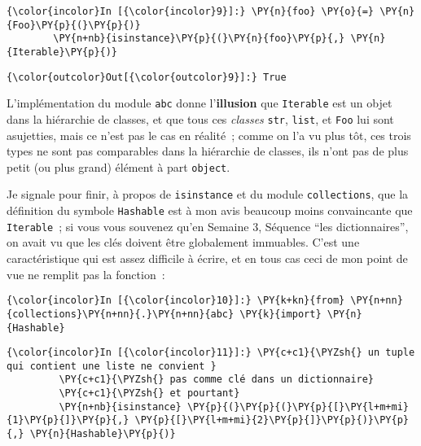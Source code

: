     \begin{Verbatim}[commandchars=\\\{\}]
{\color{incolor}In [{\color{incolor}9}]:} \PY{n}{foo} \PY{o}{=} \PY{n}{Foo}\PY{p}{(}\PY{p}{)}
        \PY{n+nb}{isinstance}\PY{p}{(}\PY{n}{foo}\PY{p}{,} \PY{n}{Iterable}\PY{p}{)}
\end{Verbatim}


\begin{Verbatim}[commandchars=\\\{\}]
{\color{outcolor}Out[{\color{outcolor}9}]:} True
\end{Verbatim}
            
    L'implémentation du module \texttt{abc} donne l'\textbf{illusion} que
\texttt{Iterable} est un objet dans la hiérarchie de classes, et que
tous ces \emph{classes} \texttt{str}, \texttt{list}, et \texttt{Foo} lui
sont asujetties, mais ce n'est pas le cas en réalité~; comme on l'a vu
plus tôt, ces trois types ne sont pas comparables dans la hiérarchie de
classes, ils n'ont pas de plus petit (ou plus grand) élément à part
\texttt{object}.

    Je signale pour finir, à propos de \texttt{isinstance} et du module
\texttt{collections}, que la définition du symbole \texttt{Hashable} est
à mon avis beaucoup moins convaincante que \texttt{Iterable}~; si vous
vous souvenez qu'en Semaine 3, Séquence ``les dictionnaires'', on avait
vu que les clés doivent être globalement immuables. C'est une
caractéristique qui est assez difficile à écrire, et en tous cas ceci de
mon point de vue ne remplit pas la fonction~:

    \begin{Verbatim}[commandchars=\\\{\}]
{\color{incolor}In [{\color{incolor}10}]:} \PY{k+kn}{from} \PY{n+nn}{collections}\PY{n+nn}{.}\PY{n+nn}{abc} \PY{k}{import} \PY{n}{Hashable}
\end{Verbatim}


    \begin{Verbatim}[commandchars=\\\{\}]
{\color{incolor}In [{\color{incolor}11}]:} \PY{c+c1}{\PYZsh{} un tuple qui contient une liste ne convient }
         \PY{c+c1}{\PYZsh{} pas comme clé dans un dictionnaire}
         \PY{c+c1}{\PYZsh{} et pourtant}
         \PY{n+nb}{isinstance} \PY{p}{(}\PY{p}{(}\PY{p}{[}\PY{l+m+mi}{1}\PY{p}{]}\PY{p}{,} \PY{p}{[}\PY{l+m+mi}{2}\PY{p}{]}\PY{p}{)}\PY{p}{,} \PY{n}{Hashable}\PY{p}{)}
\end{Verbatim}


